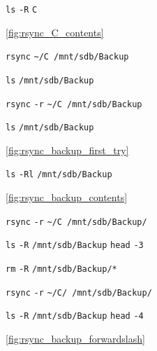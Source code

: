 \documentclass[11pt]{article}
\newcommand{\imagecaption}[1]{\vspace{-7pt}\caption*{\char91\ref{fig:#1}\char93}}
\newcommand{\codetext}[2]{\large\texttt{\textcolor{#1}{#2}}}
\begin{document}
		\begin{figure}[H]
			\centering
			\begin{code-box}
				\codetext{light-blue}{ls} \codetext{light-orange}{-R} \codetext{light-red}{C}
			\end{code-box}
			\imagecaption{rsync_C_contents}
		\end{figure}

		\begin{figure}[H]
			\centering
			\begin{code-box}
				\codetext{light-blue}{rsync} \codetext{light-red}{\textasciitilde/C /mnt/sdb/Backup}

				\codetext{light-blue}{ls} \codetext{light-red}{/mnt/sdb/Backup}

				\codetext{light-blue}{rsync} \codetext{light-orange}{-r} \codetext{light-red}{\textasciitilde/C /mnt/sdb/Backup}

				\codetext{light-blue}{ls} \codetext{light-red}{/mnt/sdb/Backup}
			\end{code-box}
			\imagecaption{rsync_backup_first_try}
		\end{figure}

		\begin{figure}[H]
			\centering
			\begin{code-box}
				\codetext{light-red}{ls} \codetext{light-orange}{-Rl} \codetext{light-red}{/mnt/sdb/Backup}
			\end{code-box}
			\imagecaption{rsync_backup_contents}
		\end{figure}

		\begin{figure}[H]
			\centering
			\begin{code-box}
				\codetext{light-blue}{rsync} \codetext{light-orange}{-r} \codetext{light-red}{\textasciitilde/C /mnt/sdb/Backup/}

				\codetext{light-blue}{ls} \codetext{light-orange}{-R} \codetext{light-red}{/mnt/sdb/Backup} \textbar{} \codetext{light-blue}{head} \codetext{light-orange}{-3}

				\codetext{light-blue}{rm} \codetext{light-orange}{-R} \codetext{light-red}{/mnt/sdb/Backup/*}

				\codetext{light-blue}{rsync} \codetext{light-orange}{-r} \codetext{light-red}{\textasciitilde/C/ /mnt/sdb/Backup/}

				\codetext{light-blue}{ls} \codetext{light-orange}{-R} \codetext{light-red}{/mnt/sdb/Backup} \textbar{} \codetext{light-blue}{head} \codetext{light-orange}{-4}
			\end{code-box}
			\imagecaption{rsync_backup_forwardslash}
		\end{figure}
\end{document}
